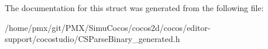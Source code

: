 The documentation for this struct was generated from the following file\+:\begin{DoxyCompactItemize}
\item 
/home/pmx/git/\+P\+M\+X/\+Simu\+Cocos/cocos2d/cocos/editor-\/support/cocostudio/C\+S\+Parse\+Binary\+\_\+generated.\+h\end{DoxyCompactItemize}
